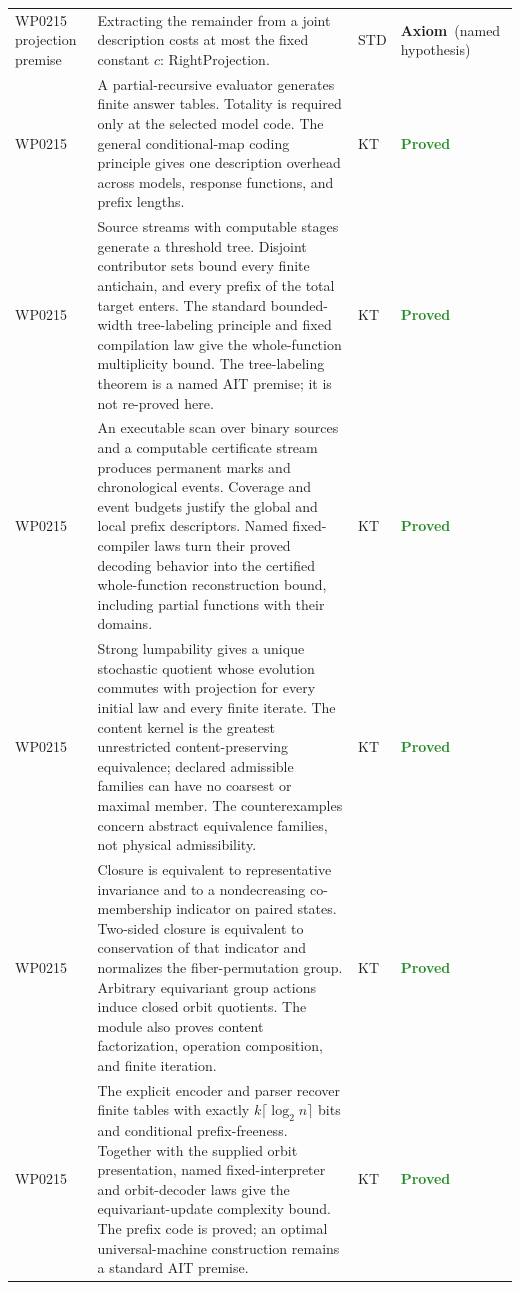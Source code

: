 \documentclass[11pt,a4paper]{article}
\newcommand{\lean}[1]{{\ttfamily\small
  \let\leanunderscore\_\def\_{\leanunderscore\allowbreak}#1}}
\newcommand{\stproved}{\textcolor{ForestGreen}{\textbf{Proved}}}
\newcommand{\staxiom}{\textcolor{bcomblue}{\textbf{Axiom}}}
\begin{document}
{\begin{longtable}{@{}p{2.1cm}p{6.6cm}p{1.0cm}p{2.6cm}@{}}
WP0215 projection premise & Extracting the remainder from a joint description costs at most the fixed constant $c$: \lean{RightProjection}. & STD & \staxiom\ (named hypothesis) \\
WP0215 & A partial-recursive evaluator generates finite answer tables. Totality is required only at the selected model code. The general conditional-map coding principle gives one description overhead across models, response functions, and prefix lengths. & KT & \stproved \\
WP0215 & Source streams with computable stages generate a threshold tree. Disjoint contributor sets bound every finite antichain, and every prefix of the total target enters. The standard bounded-width tree-labeling principle and fixed compilation law give the whole-function multiplicity bound. The tree-labeling theorem is a named AIT premise; it is not re-proved here. & KT & \stproved \\
WP0215 & An executable scan over binary sources and a computable certificate stream produces permanent marks and chronological events. Coverage and event budgets justify the global and local prefix descriptors. Named fixed-compiler laws turn their proved decoding behavior into the certified whole-function reconstruction bound, including partial functions with their domains. & KT & \stproved \\
WP0215 & Strong lumpability gives a unique stochastic quotient whose evolution commutes with projection for every initial law and every finite iterate. The content kernel is the greatest unrestricted content-preserving equivalence; declared admissible families can have no coarsest or maximal member. The counterexamples concern abstract equivalence families, not physical admissibility. & KT & \stproved \\
WP0215 & Closure is equivalent to representative invariance and to a nondecreasing co-membership indicator on paired states. Two-sided closure is equivalent to conservation of that indicator and normalizes the fiber-permutation group. Arbitrary equivariant group actions induce closed orbit quotients. The module also proves content factorization, operation composition, and finite iteration. & KT & \stproved \\
WP0215 & The explicit encoder and parser recover finite tables with exactly $k\lceil\log_2 n\rceil$ bits and conditional prefix-freeness. Together with the supplied orbit presentation, named fixed-interpreter and orbit-decoder laws give the equivariant-update complexity bound. The prefix code is proved; an optimal universal-machine construction remains a standard AIT premise. & KT & \stproved \\

\end{longtable}}
\end{document}
